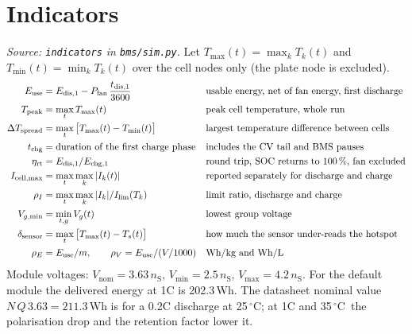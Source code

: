 \documentclass[11pt,a4paper]{article}
\newcommand{\degC}{\ensuremath{{}^{\circ}\mathrm{C}}}
\newcommand{\nS}{n_{\mathrm{S}}}
\begin{document}
\section{Indicators}\label{sec:ind}
\emph{Source: \texttt{indicators} in \texttt{bms/sim.py}.}
Let $T_{\max}(t)=\max_k T_k(t)$ and $T_{\min}(t)=\min_k T_k(t)$ over the cell nodes only (the plate node is excluded).
\begin{align*}
E_{\mathrm{use}} &= E_{\mathrm{dis},1}-P_{\mathrm{fan}}\,\frac{t_{\mathrm{dis},1}}{3600}
&&\text{usable energy, net of fan energy, first discharge}\\
T_{\mathrm{peak}} &= \max_t T_{\max}(t)
&&\text{peak cell temperature, whole run}\\
\Delta T_{\mathrm{spread}} &= \max_t\big[T_{\max}(t)-T_{\min}(t)\big]
&&\text{largest temperature difference between cells}\\
t_{\mathrm{chg}} &= \text{duration of the first charge phase}
&&\text{includes the CV tail and BMS pauses}\\
\eta_{\mathrm{rt}} &= E_{\mathrm{dis},1}/E_{\mathrm{chg},1}
&&\text{round trip, SOC returns to 100\,\%, fan excluded}\\
I_{\mathrm{cell,max}} &= \max_t \max_k |I_k(t)|
&&\text{reported separately for discharge and charge}\\
\rho_{I} &= \max_t \max_k |I_k|/I_{\lim}(T_k)
&&\text{limit ratio, discharge and charge}\\
V_{g,\min} &= \min_{t,g} V_g(t)
&&\text{lowest group voltage}\\
\delta_{\mathrm{sensor}} &= \max_t\big[T_{\max}(t)-T_s(t)\big]
&&\text{how much the sensor under-reads the hotspot}\\
\rho_E &= E_{\mathrm{use}}/m,\qquad \rho_V=E_{\mathrm{use}}/(V/1000)
&&\text{Wh/kg and Wh/L}
\end{align*}
Module voltages: $V_{\mathrm{nom}}=3.63\,\nS$, $V_{\min}=2.5\,\nS$, $V_{\max}=4.2\,\nS$. For the default module the delivered energy at 1C is 202.3\,Wh. The datasheet nominal value $N\,Q\,3.63=211.3$\,Wh is for a 0.2C discharge at 25\,\degC; at 1C and 35\,\degC\ the polarisation drop and the retention factor lower it.
\end{document}
